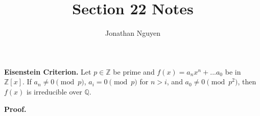 \documentclass[11pt]{article}
\title{Section 22 Notes}
\author{Jonathan Nguyen}
\date{}
\begin{document}
\maketitle

\begin{theorem}
    \textbf{Eisenstein Criterion.} Let $p \in \mathbb{Z}$ be prime and $f(x) = a_nx^n + ... a_0$ be in $\mathbb{Z}[x]$. 
    If $a_n \neq 0 \pmod{p}$, $a_i = 0 \pmod{p}$ for $n > i$, and $a_0 \neq 0 \pmod{p^2}$, then $f(x)$ is irreducible over $\mathbb{Q}$.
\end{theorem}

\textbf{Proof.}
\end{document}
